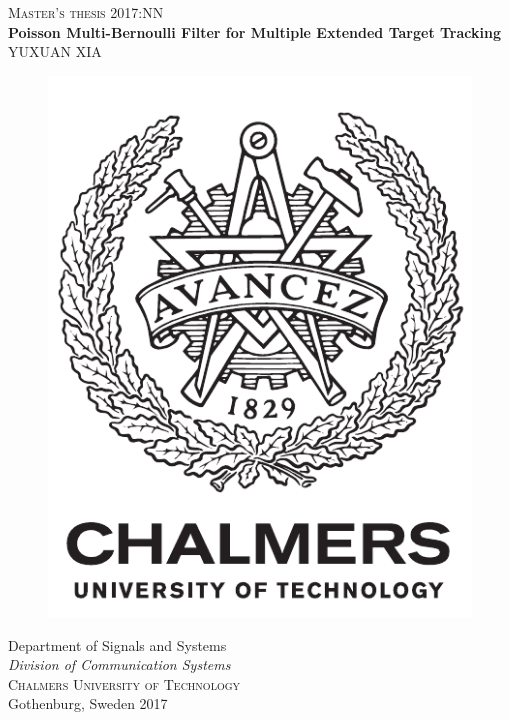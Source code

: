 \newpage
\thispagestyle{empty}
\begin{center}
	\textsc{\large Master's thesis 2017:NN}\\[4cm]		%
	\textbf{\Large Poisson Multi-Bernoulli Filter for Multiple Extended Target Tracking} \\[1cm]
	{\large YUXUAN XIA}
	
	\vfill	
	\begin{figure}[H]
	\centering
	\includegraphics[width=0.2\pdfpagewidth]{figure/auxiliary/logo_eng.pdf} \\	
	\end{figure}	\vspace{5mm}	
	
	Department of Signals and Systems \\
	\emph{Division of Communication Systems}\\
	\textsc{Chalmers University of Technology} \\
	Gothenburg, Sweden 2017 \\
\end{center}


